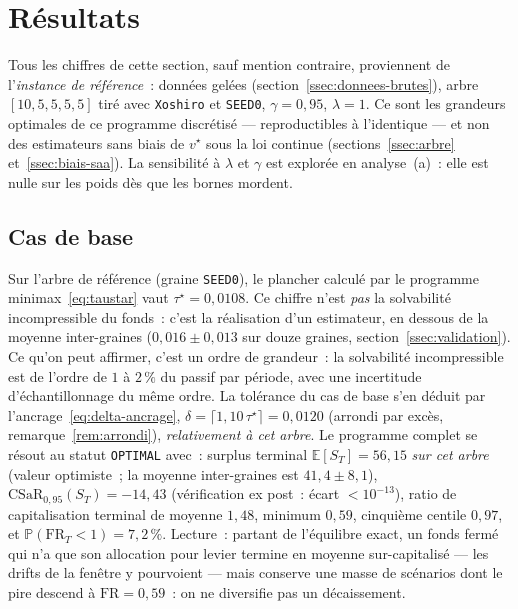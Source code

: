 \documentclass[11pt,letterpaper]{article}
\newcommand{\E}{\mathbb{E}}
\newcommand{\prob}{\mathbb{P}}
\newcommand{\CSaR}{\mathrm{CSaR}}
\newcommand{\taustar}{\tau^{\star}}
\theoremstyle{definition}
\begin{document}
\section{Résultats}\label{sec:resultats}

Tous les chiffres de cette section, sauf mention contraire, proviennent de
l'\emph{instance de référence}~: données gelées
(section~\ref{ssec:donnees-brutes}), arbre $[10,5,5,5,5]$ tiré avec
\texttt{Xoshiro} et \texttt{SEED0}, $\gamma = 0{,}95$, $\lambda = 1$. Ce sont
les grandeurs optimales de ce programme discrétisé --- reproductibles à
l'identique --- et non des estimateurs sans biais de $v^\star$ sous la loi
continue (sections~\ref{ssec:arbre} et~\ref{ssec:biais-saa}). La sensibilité à
$\lambda$ et $\gamma$ est explorée en analyse~(a)~: elle est nulle sur les
poids dès que les bornes mordent.

\subsection{Cas de base}\label{ssec:resultats-base}

Sur l'arbre de référence (graine \texttt{SEED0}), le plancher calculé par le
programme minimax~\eqref{eq:taustar} vaut $\taustar = 0{,}0108$. Ce chiffre n'est
\emph{pas} la solvabilité incompressible du fonds~: c'est la réalisation d'un
estimateur, en dessous de la moyenne inter-graines
($0{,}016 \pm 0{,}013$ sur douze graines, section~\ref{ssec:validation}). Ce qu'on
peut affirmer, c'est un ordre de grandeur~: la solvabilité incompressible est de
l'ordre de $1$ à $2\,\%$ du passif par période, avec une incertitude
d'échantillonnage du même ordre. La tolérance du cas de base s'en déduit par
l'ancrage~\eqref{eq:delta-ancrage}, $\delta = \lceil 1{,}10\,\taustar\rceil =
0{,}0120$ (arrondi par excès, remarque~\ref{rem:arrondi}), \emph{relativement à
cet arbre}. Le programme complet se résout au statut \texttt{OPTIMAL} avec~:
surplus terminal $\E[S_T] = 56{,}15$ \emph{sur cet arbre} (valeur optimiste~; la
moyenne inter-graines est $41{,}4 \pm 8{,}1$), $\CSaR_{0{,}95}(S_T) = -14{,}43$
(vérification ex post~: écart $< 10^{-13}$), ratio de capitalisation terminal de
moyenne $1{,}48$, minimum $0{,}59$, cinquième centile $0{,}97$, et
$\prob(\mathrm{FR}_T < 1) = 7{,}2\,\%$. Lecture~: partant de l'équilibre exact, un
fonds fermé qui n'a que son allocation pour levier termine en moyenne
sur-capitalisé --- les drifts de la fenêtre y pourvoient --- mais conserve une
masse de scénarios dont le pire descend à $\mathrm{FR} = 0{,}59$~: on ne
diversifie pas un décaissement.
\end{document}
